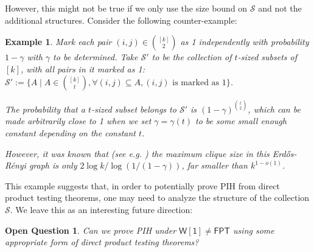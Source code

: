 \documentclass[10pt,a4paper]{article}
\newtheorem{question}{Open Question}
\newtheorem{example}[theorem]{Example}
\newcommand{\wone}{\mathsf{W[1]}}
\newcommand{\fpt}{\mathsf{FPT}}
\begin{document}
However, this might not be true if we only use the size bound on $\mathcal S$ and not the additional structures. Consider the following counter-example:

\begin{example}
    Mark each pair $(i,j) \in \binom{[k]}{2}$ as 1 independently with probability $1-\gamma$ with $\gamma$ to be determined. Take $\mathcal S'$ to be the collection of $t$-sized subsets of $[k]$, with all pairs in it marked as 1: $\mathcal S':=\{A \mid A \in \binom{[k]}{t}, \forall (i,j) \subseteq A, (i,j)\text{ is marked as 1}\}$.

    The probability that a $t$-sized subset belongs to $\mathcal S'$ is $(1-\gamma)^{\binom{t}{2}}$, which can be made arbitrarily close to 1 when we set $\gamma=\gamma(t)$ to be some small enough constant depending on the constant $t$.

    However, it was known that (see e.g. \cite{Grimmett_McDiarmid_1975}) the maximum clique size in this Erd\H{o}s-R\'enyi graph is only $2 \log k/\log (1/(1-\gamma))$, far smaller than $k^{1-o(1)}$.
\end{example}

This example suggests that, in order to potentially prove PIH from direct product testing theorems, one may need to analyze the structure of the collection $\mathcal S$. We leave this as an interesting future direction:

\begin{question}
    Can we prove PIH under $\wone \ne \fpt$ using some appropriate form of direct product testing theorems?
\end{question}
\end{document}
